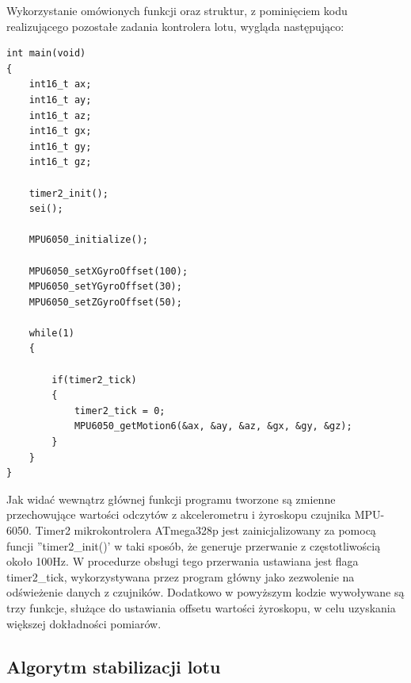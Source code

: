 Wykorzystanie omówionych funkcji oraz struktur, z pominięciem kodu realizującego pozostałe zadania kontrolera lotu, wygląda następująco:

\begin{lstlisting}
int main(void)
{
	int16_t ax;
	int16_t ay;
	int16_t az;
	int16_t gx;
	int16_t gy;
	int16_t gz;

	timer2_init();
	sei();

	MPU6050_initialize();

	MPU6050_setXGyroOffset(100);
	MPU6050_setYGyroOffset(30);
	MPU6050_setZGyroOffset(50);

	while(1)
	{
		
		if(timer2_tick)
		{
			timer2_tick = 0;
			MPU6050_getMotion6(&ax, &ay, &az, &gx, &gy, &gz);
		}
	}
}
\end{lstlisting}

Jak widać wewnątrz głównej funkcji programu tworzone są zmienne przechowujące wartości odczytów z akcelerometru i żyroskopu czujnika MPU-6050. Timer2 mikrokontrolera ATmega328p jest zainicjalizowany za pomocą funcji ''timer2\_init()' w taki sposób, że generuje przerwanie z częstotliwością około 100Hz. W procedurze obsługi tego przerwania ustawiana jest flaga timer2\_tick, wykorzystywana przez program główny jako zezwolenie na odświeżenie danych z czujników. Dodatkowo w powyższym kodzie wywoływane są trzy funkcje, służące do ustawiania offsetu wartości żyroskopu, w celu uzyskania większej dokładności pomiarów.

\subsection{Algorytm stabilizacji lotu}

